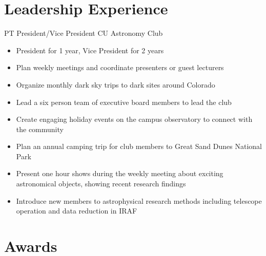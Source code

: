 \documentclass[11pt]{article} %
\begin{document}
\pagebreak[3]
\section{Leadership Experience}
    {PT} %
    {President/Vice President} %
    {CU Astronomy Club} %
    {}
    {\begin{itemize}
    \setlength\itemsep{0.1em}
        \item President for 1 year, Vice President for 2 years
        \item Plan weekly meetings and coordinate presenters or guest lecturers
        \item Organize monthly dark sky trips to dark sites around Colorado
        \item Lead a six person team of executive board members to lead the club
        \item Create engaging holiday events on the campus observatory to connect with the community
        \item Plan an annual camping trip for club members to Great Sand Dunes National Park
        \item Present one hour shows during the weekly meeting about exciting astronomical objects, showing recent research findings
        \item Introduce new members to astrophysical research methods including telescope operation and data reduction in IRAF
    \end{itemize}
} %


\pagebreak[3]
\section{Awards}



\end{document}
